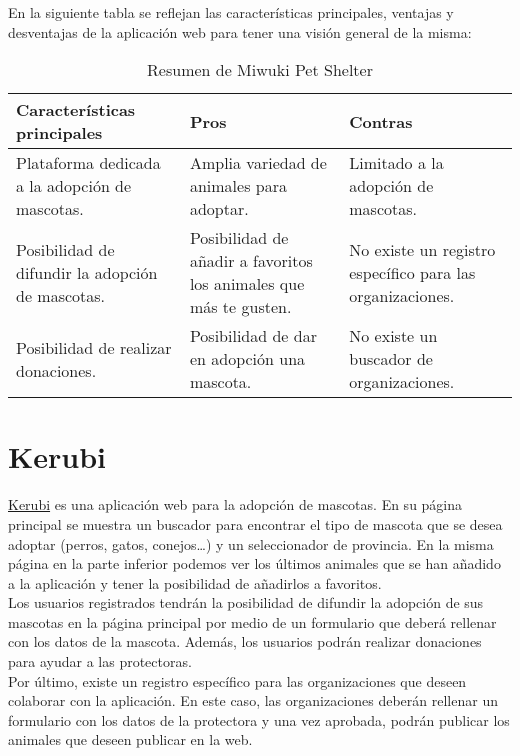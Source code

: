 En la siguiente tabla se reflejan las características principales, ventajas y desventajas de la aplicación web
para tener una visión general de la misma: \\

\begin{table}[h]
\centering
\begin{tabular}{|p{6cm}|p{4cm}|p{4cm}|}
\hline
\textbf{Características principales} & \textbf{Pros} & \textbf{Contras} \\
\hline
Plataforma dedicada a la adopción de mascotas. &
Amplia variedad de animales para adoptar. &
Limitado a la adopción de mascotas. \\
\hline
Posibilidad de difundir la adopción de mascotas. &
Posibilidad de añadir a favoritos los animales que más te gusten. &
No existe un registro específico para las organizaciones. \\
\hline
Posibilidad de realizar donaciones. &
Posibilidad de dar en adopción una mascota. &
No existe un buscador de organizaciones. \\
\hline
\end{tabular}
\caption{Resumen de Miwuki Pet Shelter}
\label{tab:miwuki}
\end{table}


\section{Kerubi}\label{sec:kerubi}

\href{https://kerubi.es}{Kerubi} es una aplicación web para la adopción de mascotas. En su página principal se muestra
un buscador para encontrar el tipo de mascota que se desea adoptar (perros, gatos, conejos\ldots) y un seleccionador de
provincia. En la misma página en la parte inferior podemos ver los últimos animales que se han añadido a la aplicación
y tener la posibilidad de añadirlos a favoritos. \\

Los usuarios registrados tendrán la posibilidad de difundir la adopción de sus mascotas en la página principal por medio
de un formulario que deberá rellenar con los datos de la mascota. Además, los usuarios podrán realizar donaciones
para ayudar a las protectoras. \\

Por último, existe un registro específico para las organizaciones que deseen colaborar con la aplicación. En este caso,
las organizaciones deberán rellenar un formulario con los datos de la protectora y una vez aprobada, podrán publicar
los animales que deseen publicar en la web. \\

